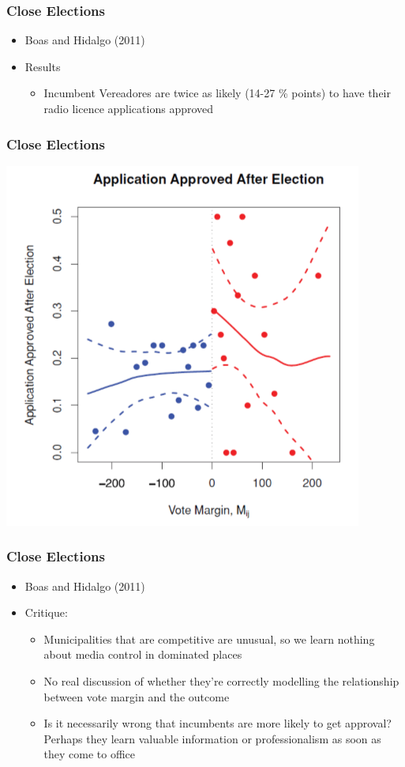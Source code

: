 \documentclass[xcolor=x11names,compress]{beamer}\usepackage[]{graphicx}\usepackage[]{color}
\renewcommand{\(}{\begin{columns}}
\renewcommand{\)}{\end{columns}}
\newcommand{\<}[1]{\begin{column}{#1}}
\renewcommand{\>}{\end{column}}
\begin{document}
\begin{frame}
\frametitle{Close Elections}
\begin{itemize}
\item Boas and Hidalgo (2011)
\item Results
\pause
\begin{itemize}
\item Incumbent Vereadores are twice as likely (14-27 \% points) to have their radio licence applications approved
\end{itemize}
\end{itemize}
\end{frame}

\begin{frame}
\frametitle{Close Elections}
\begin{center}
\includegraphics[scale=0.35]{figure/BH_Results.png}
\end{center}
\end{frame}

\begin{frame}
\frametitle{Close Elections}
\begin{itemize}
\item Boas and Hidalgo (2011)
\item Critique:
\pause
\begin{itemize}
\item Municipalities that are competitive are unusual, so we learn nothing about media control in dominated places
\pause
\item No real discussion of whether they're correctly modelling the relationship between vote margin and the outcome
\pause
\item Is it necessarily wrong that incumbents are more likely to get approval? Perhaps they learn valuable information or professionalism as soon as they come to office
\end{itemize}
\end{itemize}
\end{frame}
\end{document}
